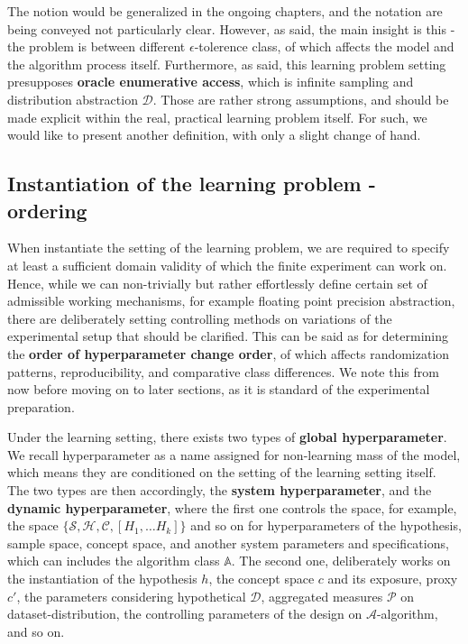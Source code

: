 The notion would be generalized in the ongoing chapters, and the notation are being conveyed not particularly clear. However, as said, the main insight is this - the problem is between different $\epsilon$-tolerence class, of which affects the model and the algorithm process itself. Furthermore, as said, this learning problem setting presupposes \textbf{oracle enumerative access}, which is infinite sampling and distribution abstraction $\mathcal{D}$. Those are rather strong assumptions, and should be made explicit within the real, practical learning problem itself. For such, we would like to present another definition, with only a slight change of hand. 
\subsection{Instantiation of the learning problem - ordering}

When instantiate the setting of the learning problem, we are required to specify at least a sufficient domain validity of which the finite experiment can work on. Hence, while we can non-trivially but rather effortlessly define certain set of admissible working mechanisms, for example floating point precision abstraction, there are deliberately setting controlling methods on variations of the experimental setup that should be clarified. This can be said as for determining the \textbf{order of hyperparameter change order}, of which affects randomization patterns, reproducibility, and comparative class differences. We note this from now before moving on to later sections, as it is standard of the experimental preparation. 

Under the learning setting, there exists two types of \textbf{global hyperparameter}. We recall hyperparameter as a name assigned for non-learning mass of the model, which means they are conditioned on the setting of the learning setting itself. The two types are then accordingly, the \textbf{system hyperparameter}, and the \textbf{dynamic hyperparameter}, where the first one controls the space, for example, the space $\{\mathcal{S},\mathcal{H},\mathcal{C},[H_{1},\dots H_{k}]\}$ and so on for hyperparameters of the hypothesis, sample space, concept space, and another system parameters and specifications, which can includes the algorithm class $\mathbb{A}$. The second one, deliberately works on the instantiation of the hypothesis $h$, the concept space $c$ and its exposure, proxy $c'$, the parameters considering hypothetical $\mathcal{D}$, aggregated measures $\mathcal{P}$ on dataset-distribution, the controlling parameters of the design on $\mathcal{A}$-algorithm, and so on. 

